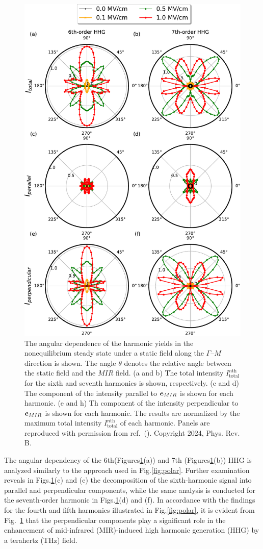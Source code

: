\begin{figure}[hbp]
	\center
	\includegraphics[width=0.8\linewidth]{pic/SI_polar.pdf}
	\caption{\label{fig:SI_polar}
		The angular dependence of the harmonic yields in the nonequilibrium steady state under a static field along the $\Gamma$--$M$ direction is shown. The angle $\theta$ denotes the relative angle between the static field and the $MIR$ field. (a and b) The total intensity $I^{n \textrm{th}}_{\mathrm{total}}$ for the sixth and seventh harmonics is shown, respectively. (c and d) The component of the intensity parallel to $\boldsymbol e_{MIR}$ is shown for each harmonic. (e and h) Th component of the intensity perpendicular to $\boldsymbol e_{MIR}$ is shown for each harmonic. The results are normalized by the maximum total intensity $I^{n \textrm{th}}_{\mathrm{total}}$ of each harmonic. Panels are reproduced with permission from ref.~(\cite{PhysRevB.109.045421}). Copyright 2024, Phys. Rev. B.
	}
\end{figure}
The angular dependency of the 6th(Figures\ref{fig:SI_polar}(a)) and 7th (Figures\ref{fig:SI_polar}(b)) \gls{HHG} is analyzed similarly to the approach used in Fig.\ref{fig:polar}. Further examination reveals in Figs.\ref{fig:SI_polar}(c) and (e) the decomposition of the sixth-harmonic signal into parallel and perpendicular components, while the same analysis is conducted for the seventh-order harmonic in Figs.\ref{fig:SI_polar}(d) and (f). In accordance with the findings for the fourth and fifth harmonics illustrated in Fig.\ref{fig:polar}, it is evident from Fig.~\ref{fig:SI_polar} that the perpendicular components play a significant role in the enhancement of mid-infrared (MIR)-induced high harmonic generation (HHG) by a terahertz (THz) field.


